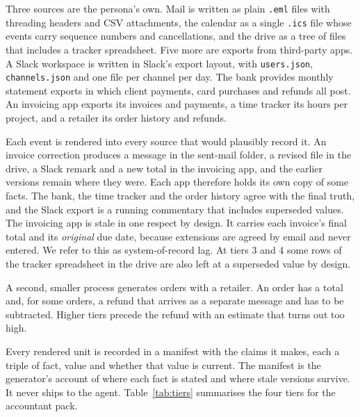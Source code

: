 \documentclass{article}
\newcommand{\code}[1]{\texttt{\small #1}}
\begin{document}
Three sources are the persona's own. Mail is written as plain \code{.eml} files with threading headers and CSV attachments, the calendar as a single \code{.ics} file whose events carry sequence numbers and cancellations, and the drive as a tree of files that includes a tracker spreadsheet. Five more are exports from third-party apps. A Slack workspace is written in Slack's export layout, with \code{users.json}, \code{channels.json} and one file per channel per day. The bank provides monthly statement exports in which client payments, card purchases and refunds all post. An invoicing app exports its invoices and payments, a time tracker its hours per project, and a retailer its order history and refunds.

Each event is rendered into every source that would plausibly record it. An invoice correction produces a message in the sent-mail folder, a revised file in the drive, a Slack remark and a new total in the invoicing app, and the earlier versions remain where they were. Each app therefore holds its own copy of some facts. The bank, the time tracker and the order history agree with the final truth, and the Slack export is a running commentary that includes superseded values. The invoicing app is stale in one respect by design. It carries each invoice's final total and its \emph{original} due date, because extensions are agreed by email and never entered. We refer to this as system-of-record lag. At tiers 3 and 4 some rows of the tracker spreadsheet in the drive are also left at a superseded value by design.

A second, smaller process generates orders with a retailer. An order has a total and, for some orders, a refund that arrives as a separate message and has to be subtracted. Higher tiers precede the refund with an estimate that turns out too high.

Every rendered unit is recorded in a manifest with the claims it makes, each a triple of fact, value and whether that value is current. The manifest is the generator's account of where each fact is stated and where stale versions survive. It never ships to the agent. Table~\ref{tab:tiers} summarises the four tiers for the accountant pack.
\end{document}
